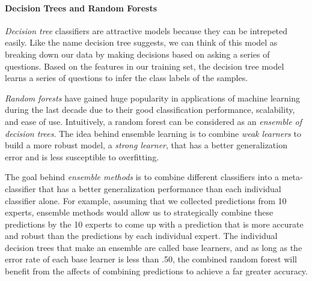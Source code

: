 \documentclass[10pt,letterpaper]{article}
\begin{document}
\paragraph{Decision Trees and Random Forests}
\emph{Decision tree} classifiers are attractive models because they can be intrepeted easily. Like the name decision tree suggests, we can think of this model as breaking down our data by making decisions based on asking a series of questions.
Based on the features in our training set, the decision tree model learns a series of questions to infer the class labels of the samples. 

\emph{Random forests} have gained huge popularity in applications of machine learning during the last decade due to their good classification performance, scalability, and ease of use. Intuitively, a random forest can be considered as an \emph{ensemble of decision trees}. The idea behind ensemble learning is to combine \emph{weak learners} to build a more robust model, a \emph{strong learner}, that has a better generalization error and is less susceptible to overfitting. 

The goal behind \emph{ensemble methods} is to combine different classifiers into a meta-classifier that has a better generalization performance than each individual classifier alone. For example, assuming that we collected predictions from 10 experts, ensemble methods would allow us to strategically combine these predictions by the 10 experts to come up with a prediction that is more accurate and robust than the predictions by each individual expert. The individual decision trees that make an ensemble are called base learners, and as long as the error rate of each base learner is less than .50, the combined random forest will benefit from the affects of combining predictions to achieve a far greater accuracy.




\end{document}
